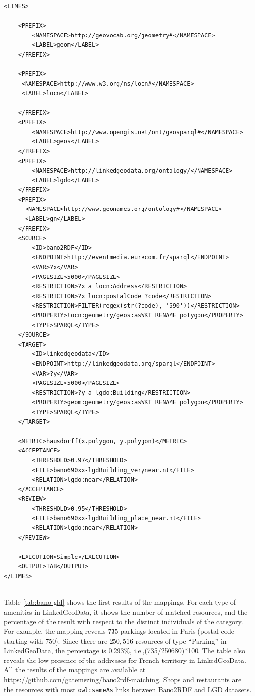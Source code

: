 \begin{lstlisting}
<LIMES>
	
	<PREFIX>
		<NAMESPACE>http://geovocab.org/geometry#</NAMESPACE>
		<LABEL>geom</LABEL>
	</PREFIX>

	<PREFIX>
     <NAMESPACE>http://www.w3.org/ns/locn#</NAMESPACE>
     <LABEL>locn</LABEL>

    </PREFIX>
	<PREFIX>
		<NAMESPACE>http://www.opengis.net/ont/geosparql#</NAMESPACE>
		<LABEL>geos</LABEL>
	</PREFIX>
	<PREFIX>
		<NAMESPACE>http://linkedgeodata.org/ontology/</NAMESPACE>
		<LABEL>lgdo</LABEL>
	</PREFIX>
	<PREFIX>
      <NAMESPACE>http://www.geonames.org/ontology#</NAMESPACE>
      <LABEL>gn</LABEL>
    </PREFIX>
	<SOURCE>
		<ID>bano2RDF</ID>
		<ENDPOINT>http://eventmedia.eurecom.fr/sparql</ENDPOINT>
		<VAR>?x</VAR>
		<PAGESIZE>5000</PAGESIZE>
		<RESTRICTION>?x a locn:Address</RESTRICTION>
		<RESTRICTION>?x locn:postalCode ?code</RESTRICTION>
		<RESTRICTION>FILTER(regex(str(?code), '690'))</RESTRICTION>
		<PROPERTY>locn:geometry/geos:asWKT RENAME polygon</PROPERTY>
		<TYPE>SPARQL</TYPE>
	</SOURCE>
	<TARGET>
		<ID>linkedgeodata</ID>
		<ENDPOINT>http://linkedgeodata.org/sparql</ENDPOINT>
		<VAR>?y</VAR>
		<PAGESIZE>5000</PAGESIZE>
		<RESTRICTION>?y a lgdo:Building</RESTRICTION>
		<PROPERTY>geom:geometry/geos:asWKT RENAME polygon</PROPERTY>
		<TYPE>SPARQL</TYPE>
	</TARGET>
	
	<METRIC>hausdorff(x.polygon, y.polygon)</METRIC>
	<ACCEPTANCE>
		<THRESHOLD>0.97</THRESHOLD>
		<FILE>bano690xx-lgdBuilding_verynear.nt</FILE>
		<RELATION>lgdo:near</RELATION>
	</ACCEPTANCE>
	<REVIEW>
		<THRESHOLD>0.95</THRESHOLD>
		<FILE>bano690xx-lgdBuilding_place_near.nt</FILE>
		<RELATION>lgdo:near</RELATION>
	</REVIEW>

	<EXECUTION>Simple</EXECUTION>
	<OUTPUT>TAB</OUTPUT>
</LIMES>
	
\end{lstlisting}

Table \ref{tab:bano-gld} shows the first results of the mappings. For each type of amenities in LinkedGeoData, it shows the number of matched resources, and the percentage of the result with respect to the distinct individuals of the category. For example, the mapping reveals $735$ parkings located in Paris (postal code starting with 750). Since there are $250,516$ resources of type ``Parking'' in LinkedGeoData, the percentage is 0.293\%, i.e.,(735/250680)*100.  The table also reveals the low presence of the addresses for French territory in LinkedGeoData. All the results of the mappings are available at \url{https://github.com/gatemezing/bano2rdf-matching}. Shops and restaurants are the resources with most \texttt{owl:sameAs} links between Bano2RDF and LGD datasets.


